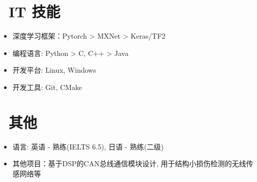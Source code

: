 \documentclass{resume}
\begin{document}

\section{\faCogs\ IT 技能}
\begin{itemize}[parsep=0.5ex]
  \item 深度学习框架：Pytorch > MXNet > Keras/TF2
  \item 编程语言: Python > C, C++ > Java
  \item 开发平台: Linux, Windows
  \item 开发工具: Git, CMake
\end{itemize}


\section{\faInfo\ 其他}
\begin{itemize}[parsep=0.5ex]
  \item 语言: 英语 - 熟练(IELTS 6.5), 日语 - 熟练(二级)
  \item 其他项目：基于DSP的CAN总线通信模块设计, 用于结构小损伤检测的无线传感网络等
\end{itemize}

%
%
\end{document}
